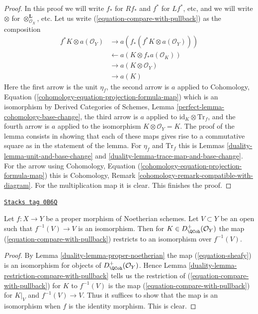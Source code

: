 \begin{proof}

In this proof we will write $f_*$ for $Rf_*$ and $f^*$ for $Lf^*$, etc,
and we will write $\otimes$ for $\otimes^\mathbf{L}_{\mathcal{O}_X}$, etc.
Let us write (\ref{equation-compare-with-pullback}) as the composition
\begin{align*}
f^*K \otimes a(\mathcal{O}_Y)
& \to
a(f_*(f^*K \otimes a(\mathcal{O}_Y))) \\
& \leftarrow
a(K \otimes f_*a(\mathcal{O}_K)) \\
& \to
a(K \otimes \mathcal{O}_Y) \\
& \to
a(K)
\end{align*}
Here the first arrow is the unit $\eta_f$, the second arrow is $a$
applied to Cohomology, Equation
(\ref{cohomology-equation-projection-formula-map}) which is an
isomorphism by Derived Categories of Schemes, Lemma
\ref{perfect-lemma-cohomology-base-change}, the third arrow is
$a$ applied to $\text{id}_K \otimes \text{Tr}_f$, and the fourth
arrow is $a$ applied to the isomorphism $K \otimes \mathcal{O}_Y = K$.
The proof of the lemma consists in showing that each of these
maps gives rise to a commutative square as in the statement of the lemma.
For $\eta_f$ and $\text{Tr}_f$ this is
Lemmas \ref{duality-lemma-unit-and-base-change} and
\ref{duality-lemma-trace-map-and-base-change}.
For the arrow using Cohomology, Equation
(\ref{cohomology-equation-projection-formula-map})
this is Cohomology, Remark \ref{cohomology-remark-compatible-with-diagram}.
For the multiplication map it is clear. This finishes the proof.
\end{proof}

\begin{lemma}
\label{duality-lemma-compare-on-open}
\href{https://stacks.math.columbia.edu/tag/0B6Q}{\texttt{Stacks tag 0B6Q}}

Let $f : X \to Y$ be a proper morphism of Noetherian schemes. Let $V \subset Y$
be an open such that $f^{-1}(V) \to V$ is an isomorphism. Then for
$K \in D_\QCoh^+(\mathcal{O}_Y)$ the map (\ref{equation-compare-with-pullback})
restricts to an isomorphism over $f^{-1}(V)$.
\end{lemma}

\begin{proof}

By Lemma \ref{duality-lemma-proper-noetherian} the map (\ref{equation-sheafy}) is an
isomorphism for objects of $D_\QCoh^+(\mathcal{O}_Y)$. Hence
Lemma \ref{duality-lemma-restriction-compare-with-pullback} tells us the
restriction of (\ref{equation-compare-with-pullback}) for $K$
to $f^{-1}(V)$ is the map (\ref{equation-compare-with-pullback})
for $K|_V$ and $f^{-1}(V) \to V$. Thus it suffices to show that
the map is an isomorphism when $f$ is the identity morphism. This is clear.
\end{proof}

